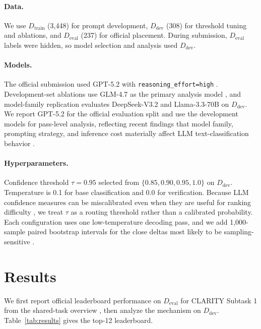 \documentclass[11pt]{article}
\newcommand{\rev}[1]{#1}
\begin{document}
\paragraph{Data.} We use $D_{\text{train}}$ (3,448) for prompt development, $D_{\text{dev}}$ (308) for threshold tuning and ablations, and $D_{\text{eval}}$ (237) for official placement. During submission, $D_{\text{eval}}$ labels were hidden, so model selection and analysis used $D_{\text{dev}}$.

\paragraph{Models.} The official submission used GPT-5.2 with \texttt{reasoning\_effort=high} \citep{openai2025gpt52}. Development-set ablations use GLM-4.7 as the primary analysis model \citep{openrouter2026glm47}, and model-family replication evaluates DeepSeek-V3.2 \citep{deepseek2025v32} and Llama-3.3-70B \citep{meta2024llama33} on $D_{\text{dev}}$. We report GPT-5.2 for the official evaluation split and use the development models for pass-level analysis, reflecting recent findings that model family, prompting strategy, and inference cost materially affect LLM text-classification behavior \citep{kostina2025classification,guo2026textreasoningbench}.

\paragraph{Hyperparameters.} Confidence threshold $\tau = 0.95$ selected from $\{0.85, 0.90, 0.95, 1.0\}$ on $D_{\text{dev}}$. Temperature is 0.1 for base classification and 0.0 for verification. Because LLM confidence measures can be miscalibrated even when they are useful for ranking difficulty \citep{groot2024overconfidence,huang2024rankcalibration,tian2023calibration,li2025harmonized}, we treat $\tau$ as a routing threshold rather than a calibrated probability. Each configuration uses one low-temperature decoding pass, and we add 1,000-sample paired bootstrap intervals for the close deltas most likely to be sampling-sensitive \citep{koehn2004statistical,dror2018hitchhiker}.

\section{Results}

We first report official leaderboard performance on $D_{\text{eval}}$ for CLARITY Subtask 1 from the shared-task overview \citep{thomas2026semeval2026task6clarity}, then analyze the mechanism on $D_{\text{dev}}$. \rev{Table~\ref{tab:results} gives the top-12 leaderboard.}
\end{document}
